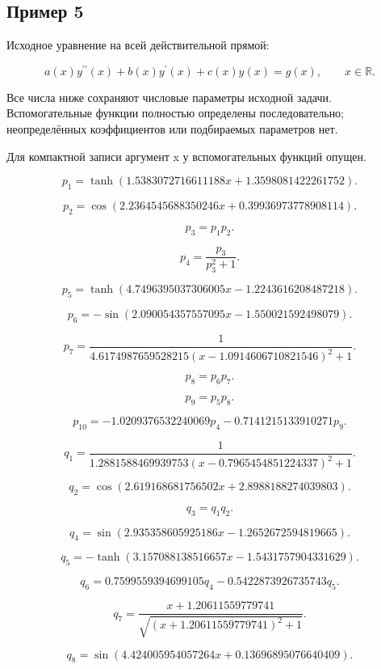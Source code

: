 \subsection*{Пример 5}

Исходное уравнение на всей действительной прямой:

\[a(x)y^{\prime\prime}(x)+b(x)y^\prime(x)+c(x)y(x)=g(x),\qquad x\in\mathbb R.\]

Все числа ниже сохраняют числовые параметры исходной задачи. Вспомогательные функции полностью определены последовательно; неопределённых коэффициентов или подбираемых параметров нет.

Для компактной записи аргумент x у вспомогательных функций опущен.

\[p_{1}=\tanh{\left(1.5383072716611188 x + 1.3598081422261752 \right)}.\]

\[p_{2}=\cos{\left(2.2364545688350246 x + 0.39936973778908114 \right)}.\]

\[p_{3}=p_{1} p_{2}.\]

\[p_{4}=\frac{p_{3}}{p_{3}^{2} + 1}.\]

\[p_{5}=\tanh{\left(4.7496395037306005 x - 1.2243616208487218 \right)}.\]

\[p_{6}=- \sin{\left(2.090054357557095 x - 1.550021592498079 \right)}.\]

\[p_{7}=\frac{1}{4.6174987659528215 \left(x - 1.0914606710821546\right)^{2} + 1}.\]

\[p_{8}=p_{6} p_{7}.\]

\[p_{9}=p_{5} p_{8}.\]

\[p_{10}=- 1.0209376532240069 p_{4} - 0.7141215133910271 p_{9}.\]

\[q_{1}=\frac{1}{1.2881588469939753 \left(x - 0.7965454851224337\right)^{2} + 1}.\]

\[q_{2}=\cos{\left(2.619168681756502 x + 2.8988188274039803 \right)}.\]

\[q_{3}=q_{1} q_{2}.\]

\[q_{4}=\sin{\left(2.935358605925186 x - 1.2652672594819665 \right)}.\]

\[q_{5}=- \tanh{\left(3.157088138516657 x - 1.5431757904331629 \right)}.\]

\[q_{6}=0.7599559394699105 q_{4} - 0.5422873926735743 q_{5}.\]

\[q_{7}=\frac{x + 1.20611559779741}{\sqrt{\left(x + 1.20611559779741\right)^{2} + 1}}.\]

\[q_{8}=\sin{\left(4.424005954057264 x + 0.13696895076640409 \right)}.\]


